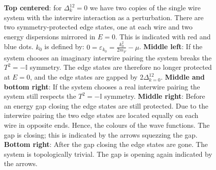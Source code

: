 \begin{figure}
\begin{tikzpicture}
\end{tikzpicture}
\caption{\textbf{Top centered}: for $\Delta^{12}_k=0$ we have two copies of the single wire system with the interwire interaction as a perturbation. There are two symmetry-protected edge states, one at each wire and two energy dispersions mirrored in $E = 0$. This is indicated with red and blue dots. $k_0$ is defined by: $0 = \varepsilon_{k_0} = \frac{k^2_0}{2m_F} - \mu$. \textbf{Middle left}: If the system chooses an imaginary interwire pairing the system breaks the $T^2 = -\mathbb{I}$ symmetry. The edge states are therefore no longer protected at $E = 0$, and the edge states are gapped by $2\Delta^{12}_{k=0}$. \textbf{Middle and bottom right}: If the system chooses a real interwire pairing the system still respects the $T^2 = -\mathbb{I}$ symmetry. \textbf{Middle right}: Before an energy gap closing the edge states are still protected. Due to the interwire pairing the two edge states are located equally on each wire in opposite ends. Hence, the colours of the wave functions. The gap is closing; this is indicated by the arrows squezzing the gap. 
\textbf{Bottom right}: After the gap closing the edge states are gone. The system is topologically trivial. The gap is opening again indicated by the arrows.}
\label{fig.2wiresedgestates}
\end{figure}

